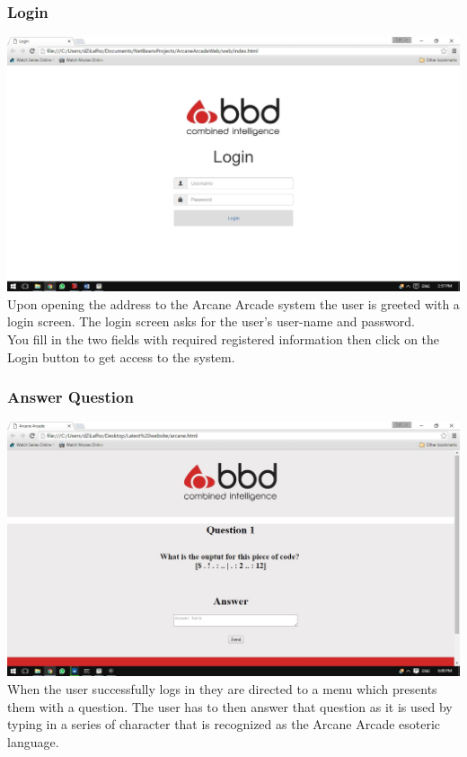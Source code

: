 \documentclass[english]{article}
\begin{document}
			\subsubsection{Login}
				\includegraphics[width=\linewidth]{Login.jpg}
				Upon opening the address to the Arcane Arcade system the user is greeted with a login screen. The login screen asks for the user's user-name and password. 
				\\[12pt]
				You fill in the two fields with required registered information then click on the Login button to get access to the system.
			
\newpage			
			\subsubsection{Answer Question}
				\includegraphics[width=\linewidth]{question.jpg}
				When the user successfully logs in they are directed to a menu which presents them with a question. The user has to then answer that question as it is used by typing in a series of character that is recognized as the Arcane Arcade esoteric language.
\end{document}
